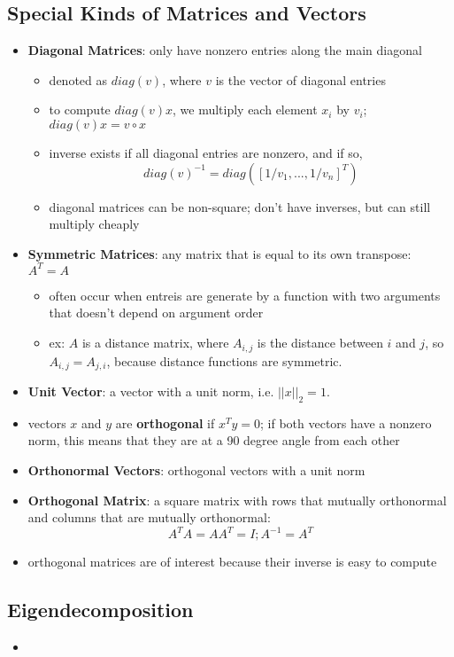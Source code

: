 \subsection{Special Kinds of Matrices and Vectors}
\begin{itemize}
    \item \textbf{Diagonal Matrices}: only have nonzero entries along the main diagonal
    \begin{itemize}
        \item denoted as $diag(v)$, where $v$ is the vector of diagonal entries
        \item to compute $diag(v)x$, we multiply each element $x_i$ by $v_i$; $diag(v)x = v \circ x$
        \item inverse exists if all diagonal entries are nonzero, and if so,
        $$ diag(v)^{-1} = diag([1/v_1, ..., 1/v_n]^T) $$
        \item diagonal matrices can be non-square; don't have inverses, but can still multiply cheaply
    \end{itemize}
    \item \textbf{Symmetric Matrices}: any matrix that is equal to its own transpose: $A^T = A$
    \begin{itemize}
        \item often occur when entreis are generate by a function with two arguments that doesn't depend on argument order
        \item ex: $A$ is a distance matrix, where $A_{i,j}$ is the distance between $i$ and $j$, so $A_{i,j} = A_{j,i}$, because distance functions are symmetric.
    \end{itemize}
    \item \textbf{Unit Vector}: a vector with a unit norm, i.e. $||x||_2 = 1$.
    \item vectors $x$ and $y$ are \textbf{orthogonal} if $x^T y = 0$; if both vectors have a nonzero norm, this means that they are at a 90 degree angle from each other 
    \item \textbf{Orthonormal Vectors}: orthogonal vectors with a unit norm
    \item \textbf{Orthogonal Matrix}: a square matrix with rows that mutually orthonormal and columns that are mutually orthonormal:
    $$ A^T A = AA^T = I; A^{-1} = A^T $$
    \item orthogonal matrices are of interest because their inverse is easy to compute
\end{itemize}

\subsection{Eigendecomposition}
\begin{itemize}
    \item
\end{itemize}

